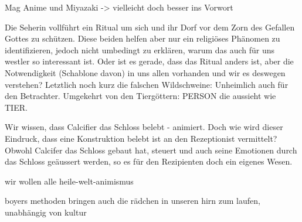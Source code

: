 Mag Anime und Miyazaki -> vielleicht doch besser ins Vorwort

Die Seherin vollführt ein Ritual um sich und ihr Dorf vor dem Zorn des Gefallen Gottes zu schützen. Diese beiden helfen aber nur ein religiöses Phänomen zu identifizieren, jedoch nicht umbedingt zu erklären, warum das auch für uns westler so interessant ist. Oder ist es gerade, dass das Ritual anders ist, aber die Notwendigkeit (Schablone davon) in uns allen vorhanden und wir es deswegen verstehen? Letztlich noch kurz die falschen Wildschweine: Unheimlich auch für den Betrachter. Umgekehrt von den Tiergöttern: PERSON die aussieht wie TIER.

Wir wissen, dass Calcifier das Schloss belebt - animiert. Doch wie wird dieser Eindruck, dass eine Konstruktion belebt ist an den Rezeptionist vermittelt?
Obwohl Calcifer das Schloss gebaut hat, steuert und auch seine Emotionen durch das Schloss geäussert werden, so es für den Rezipienten doch ein eigenes Wesen.

wir wollen alle heile-welt-animismus

boyers methoden bringen auch die rädchen in unseren hirn zum laufen, unabhängig von kultur